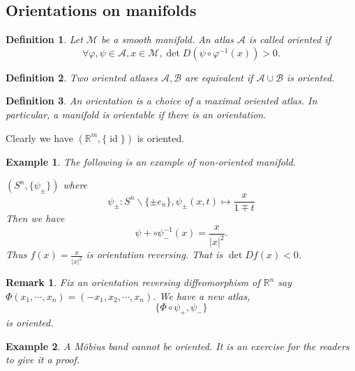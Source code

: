\documentclass[10pt]{article}
\newtheorem{definition}{Definition}[section]
\newtheorem{remark}{Remark}[section]
\newtheorem{example}{Example}[section]
\DeclareMathOperator{\id}{id}
\newcommand{\R}[0]{\mathbb{R}}
\newcommand{\M}[0]{\mathcal{M}}
\begin{document}
\subsection{Orientations on manifolds}

\begin{definition}
  Let $\M$ be a smooth manifold. An atlas $\mathscr{A}$ is called oriented if 
  \begin{equation*}
    \forall\varphi,\psi\in\mathscr{A},x\in\M,\det D(\psi\circ\varphi^{-1}(x))>0.
  \end{equation*}
\end{definition}

\begin{definition}
  Two oriented atlases $\mathscr{A},\mathscr{B}$ are equivalent if $\mathscr{A}\cup\mathscr{B}$ is oriented.
\end{definition}

\begin{definition}
  An orientation is a choice of a maximal oriented atlas. In particular, a manifold is orientable if there is an orientation.
\end{definition}

Clearly we have $(\R^m,\{\id\})$ is oriented. 

\begin{example}The following is an example of non-oriented manifold.
    \item $(S^n,\{\psi_{\pm}\})$ where 
    \begin{equation*}
    \psi_\pm:S^n\backslash\{\pm e_n\},\psi_\pm(x,t)\mapsto {\frac x {1\mp t}}
    \end{equation*}
    Then we have 
    \begin{equation*}
    \psi+\circ\psi_-^{-1}(x) = {\frac x {\vert x\vert^2}}.
    \end{equation*}
    Thus $f(x) = {\frac x {\vert x\vert^2}}$ is orientation reversing. That is $\det Df(x)<0$.
\end{example}

\begin{remark}
  Fix an orientation reversing diffeomorphism of $\R^n$ say $\Phi(x_1,\cdots,x_n) = (-x_1,x_2,\cdots,x_n)$. We have a new atlas,
  \begin{equation*}
  \{\Phi\circ\psi_+,\psi_-\}
  \end{equation*}
  is oriented.
\end{remark}

\begin{example}
  A Möbius band cannot be oriented. It is an exercise for the readers to give it a proof.
\end{example}
\end{document}
